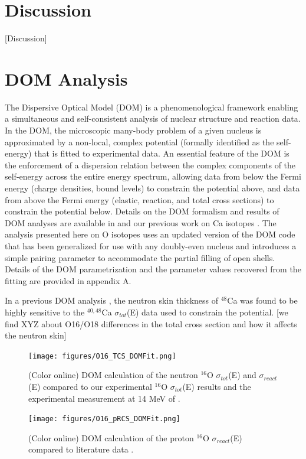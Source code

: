 \documentclass[twocolumn,secnumarabic,amssymb, nobibnotes, aps, prl,
superscriptaddress, nobalancelastpage]{revtex4}
\newcommand{\totEs}{\ensuremath{\sigma_{tot}}(E)\,\,}
\newcommand{\reactEs}{\ensuremath{\sigma_{react}}(E)\,\,}
\begin{document}
\section{Discussion}

[Discussion]

\section{DOM Analysis}

The Dispersive Optical Model (DOM) is a phenomenological framework enabling
a simultaneous and self-consistent analysis of nuclear structure and reaction
data. In the DOM, the microscopic many-body problem of a given nucleus is
approximated by a non-local, complex potential (formally identified as the
self-energy) that is fitted to experimental data. An essential feature of the
DOM is the enforcement of a dispersion
relation between the complex components of the self-energy across the entire
energy spectrum, allowing data from below the Fermi energy (charge densities,
bound levels) to constrain the potential above, and data from above the Fermi
energy (elastic, reaction, and total cross sections) to constrain the potential
below. Details on the DOM formalism and results of DOM analyses are available in
\cite{Mahaux} and our previous work on Ca isotopes
\cite{Mahzoon}. The analysis presented here on O isotopes uses an updated version
of the DOM code that has been generalized for use with any doubly-even nucleus
and introduces a simple pairing parameter \Delta to accommodate the partial filling
of open shells. Details of the DOM parametrization and the parameter values
recovered from the fitting are provided in appendix A.

In a previous DOM analysis \cite{}, the neutron skin thickness of $^{48}$Ca was
found to be highly sensitive to the $^{40,48}$Ca \totEs data used to constrain
the potential. [we find XYZ about O16/O18 differences in the total cross section
and how it affects the neutron skin]

\begin{figure}
    \texttt{[image: figures/O16\_TCS\_DOMFit.png]}
    \caption{(Color online) DOM calculation of the neutron $^{16}$O \totEs and
        \reactEs compared to our experimental $^{16}$O \totEs results and the
        experimental \reacts measurement at 14 MeV of \cite{Dukarevich1967}.
    }
    \label{O16_TCS_DOMFit}
\end{figure}

\begin{figure}
    \texttt{[image: figures/O16\_pRCS\_DOMFit.png]}
    \caption{(Color online) DOM calculation of the proton $^{16}$O \reactEs compared to
        literature data \cite{Carlson}.
    }
    \label{O16_RCS_DOMFit}
\end{figure}
\end{document}
